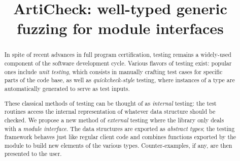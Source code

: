 \documentclass[nonatbib]{sigplanconf}
\newcommand{\arti}{\textsf{ArtiCheck}\xspace}
\begin{document}
\setlength{\pdfpageheight}{\paperheight}
\setlength{\pdfpagewidth}{\paperwidth}

\exclusivelicense


\title{\arti: well-typed generic fuzzing for module interfaces}


\maketitle

\begin{abstract}
  In spite of recent advances in full program certification, testing remains a
  widely-used component of the software development cycle. Various flavors of
  testing exist: popular ones include \emph{unit testing}, which consists in
  manually crafting test cases for specific parts of the code base, as well as
  \emph{quickcheck-style} testing, where instances of a type are automatically
  generated to serve as test inputs.

  These classical methods of testing can be thought of as \emph{internal}
  testing: the test routines access the internal representation of whatever data
  structure should be checked. We propose a new method of \emph{external}
  testing where the library only deals with a \emph{module interface}. The data
  structures are exported as \emph{abstract types}; the testing framework
  behaves just like regular client code and combines functions exported by the
  module to build new elements of the various types. Counter-examples, if any,
  are then presented to the user.
\end{abstract}













\end{document}
